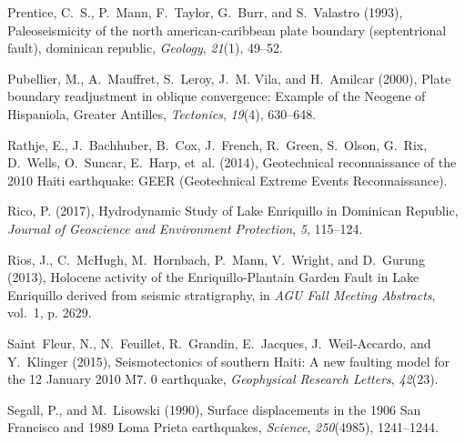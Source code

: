 \documentclass[linenumbers,draft]{agujournal}
\begin{document}
\begin{thebibliography}{62}
Prentice, C.~S., P.~Mann, F.~Taylor, G.~Burr, and S.~Valastro (1993),
  Paleoseismicity of the north american-caribbean plate boundary (septentrional
  fault), dominican republic, \textit{Geology}, \textit{21}(1), 49--52.

Pubellier, M., A.~Mauffret, S.~Leroy, J.~M. Vila, and H.~Amilcar (2000), Plate
  boundary readjustment in oblique convergence: {Example of the Neogene of
  Hispaniola, Greater Antilles}, \textit{Tectonics}, \textit{19}(4), 630--648.

Rathje, E., J.~Bachhuber, B.~Cox, J.~French, R.~Green, S.~Olson, G.~Rix,
  D.~Wells, O.~Suncar, E.~Harp, et~al. (2014), {Geotechnical reconnaissance of
  the 2010 Haiti earthquake: GEER (Geotechnical Extreme Events
  Reconnaissance)}.

Rico, P. (2017), {Hydrodynamic Study of Lake Enriquillo in Dominican Republic},
  \textit{Journal of Geoscience and Environment Protection}, \textit{5},
  115--124.

Rios, J., C.~McHugh, M.~Hornbach, P.~Mann, V.~Wright, and D.~Gurung (2013),
  Holocene activity of the {Enriquillo-Plantain Garden Fault in Lake
  Enriquillo} derived from seismic stratigraphy, in \textit{AGU Fall Meeting
  Abstracts}, vol.~1, p. 2629.

Saint~Fleur, N., N.~Feuillet, R.~Grandin, E.~Jacques, J.~Weil-Accardo, and
  Y.~Klinger (2015), {Seismotectonics of southern Haiti: A new faulting model
  for the 12 January 2010 M7. 0 earthquake}, \textit{Geophysical Research
  Letters}, \textit{42}(23).

Segall, P., and M.~Lisowski (1990), {Surface displacements in the 1906 San
  Francisco and 1989 Loma Prieta earthquakes}, \textit{Science},
  \textit{250}(4985), 1241--1244.


\end{thebibliography}
\end{document}
